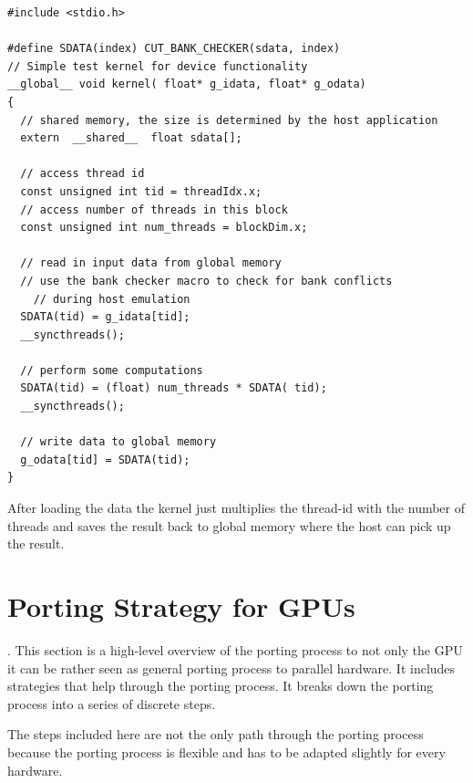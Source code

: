 \begin{lstlisting}[caption=CUDA device code, label=lst:device]
#include <stdio.h>

#define SDATA(index) CUT_BANK_CHECKER(sdata, index)
// Simple test kernel for device functionality
__global__ void kernel( float* g_idata, float* g_odata) 
{
  // shared memory, the size is determined by the host application
  extern  __shared__  float sdata[];

  // access thread id 
  const unsigned int tid = threadIdx.x;
  // access number of threads in this block 
  const unsigned int num_threads = blockDim.x;

  // read in input data from global memory
  // use the bank checker macro to check for bank conflicts
 	// during host emulation 
  SDATA(tid) = g_idata[tid];
  __syncthreads();

  // perform some computations 
  SDATA(tid) = (float) num_threads * SDATA( tid);
  __syncthreads();

  // write data to global memory 
  g_odata[tid] = SDATA(tid);
} 
\end{lstlisting} 


After loading the data the kernel just multiplies the thread-id with the number
of threads and saves the result back to global memory where the host can pick up
the result.

\section{Porting Strategy for GPUs}.%
\label{sec:porting_strategies_for_gpu} 
This section  is a high-level overview of the porting process to not only
the \gls{GPU} it can be rather seen as general porting process to parallel 
hardware. It includes strategies that help through the porting process. It 
breaks down the porting process into a series of discrete steps. 

The steps included here are not the only path through the porting process because
the porting process is flexible and has to be adapted slightly for every hardware. 

